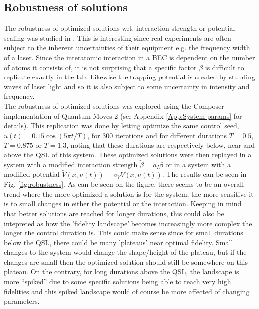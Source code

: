 \documentclass[a4paper, twocolumn]{revtex4-1}
\begin{document}
\subsection{\label{subsec:robustness} Robustness of solutions}
The robustness of optimized solutions wrt. interaction strength or potential scaling was studied in \cite{GroupPaper}. This is interesting since real experiments are often subject to the inherent uncertainties of their equipment e.g. the frequency width of a laser. Since the interatomic interaction in a BEC is dependent on the number of atoms it consists of, it is not surprising that a specific factor $\beta$ is difficult to replicate exactly in the lab. Likewise the trapping potential is created by standing waves of laser light and so it is also subject to some uncertainty in intensity and frequency.  \\
The robustness of optimized solutions was explored using the Composer implementation of Quantum Moves 2 (see Appendix \ref{App:System-params} for details). This replication was done by letting  optimize the same control seed, $u(t)=0.15\cos(5\pi t/T)$, for $300$ iterations and for different durations $T=0.5$, $T=0.875$ or $T=1.3$, noting that these durations are respectively below, near and above the QSL of this system. These optimized solutions were then replayed in a system with a modified interaction strength $\tilde{\beta} = a_I \beta$ or in a system with a modified potential $\tilde{V}(x,u(t)) = a_V V(x,u(t))$. The results can be seen in Fig. \ref{fig:robustness}. As can be seen on the figure, there seems to be an overall trend where the more optimized a solution is for the system, the more sensitive it is to small changes in either the potential or the interaction. Keeping in mind that better solutions are reached for longer durations, this could also be intepreted as how the 'fidelity landscape' becomes increasingly more complex the longer the control duration is. This could make sense since for small durations below the QSL, there could be many 'plateaus' near optimal fidelity. Small changes to the system would change the shape/height of the plateau, but if the changes are small then the optimized solution should still be somewhere on this plateau. On the contrary, for long durations above the QSL, the landscape is more ``spiked'' due to some specific solutions being able to reach very high fidelities and this spiked landscape would of course be more affected of changing parameters. \\
\end{document}
